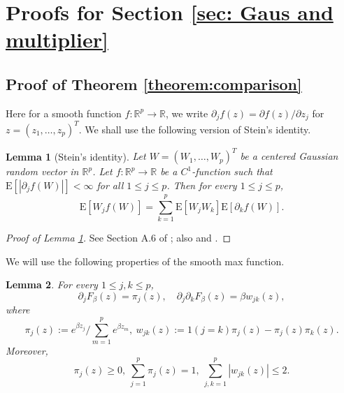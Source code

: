 \documentclass[11pt,reqno]{amsart}
\newtheorem{lemma}{Lemma}
\theoremstyle{definition}
\newcommand{\Ep}{{\mathrm{E}}}
\newcommand{\RR}{\mathbb{R}}
\begin{document}
\section{Proofs for Section \ref{sec: Gaus and multiplier}}
\label{sec: proof for section 2}

\subsection{Proof of Theorem  \ref{theorem:comparison}}

Here for a smooth function $f: \RR^{p} \to \RR$, we write $\partial_{j} f (z) = \partial f(z)/\partial z_{j}$ for $z = (z_{1},\dots,z_{p})^{T}$.
We shall use the following version of Stein's identity.

\begin{lemma}[Stein's identity]
\label{lemma: talagrand}
Let $W =(W_{1},\dots,W_{p})^{T}$ be a centered Gaussian random vector in $\RR^{p}$.
Let $f: \RR^{p} \to \RR$ be a $C^1$-function such that $\Ep [ |\partial_{j} f(W) | ] < \infty$ for all $1 \leq j \leq p$. Then for every $1 \leq j \leq p$,
\begin{equation*}
\Ep[W_{j}f(W)]=\sum_{k=1}^p\Ep[W_{j} W_{k}] \Ep [\partial_k f (W)].
\end{equation*}
\end{lemma}
\begin{proof}[Proof of Lemma \ref{lemma: talagrand}]
See Section A.6 of \cite{Talagrand2003}; also \cite{ChenGoldsteinShao2011} and \cite{Stein1981}.
\end{proof}

We will use the following properties of the smooth max function.

\begin{lemma}
\label{lemma: smooth max property}
For every $1 \leq j,k \leq p$,
\begin{equation*}
 \partial_{j} F_{\beta}(z) = \pi_{j}(z), \quad \partial_{j} \partial_k F_{\beta}(z) = \beta w_{jk} (z),
\end{equation*}
where
\begin{equation*}
\pi_{j}(z)  :=    e^{\beta z_{j}}/{\textstyle \sum}_{m=1}^pe^{\beta z_m}, \ w_{jk}(z) := 1 (j = k) \pi_{j} (z)- \pi_{j}(z) \pi_{k} (z).
\end{equation*}
Moreover,
\begin{equation*}
\pi_{j}(z) \geq 0,  \  {\textstyle \sum}_{j=1}^p \pi_{j} (z) = 1, \ {\textstyle \sum}_{j,k=1}^p |w_{jk}(z)|  \leq 2.
\end{equation*}
\end{lemma}
\end{document}
